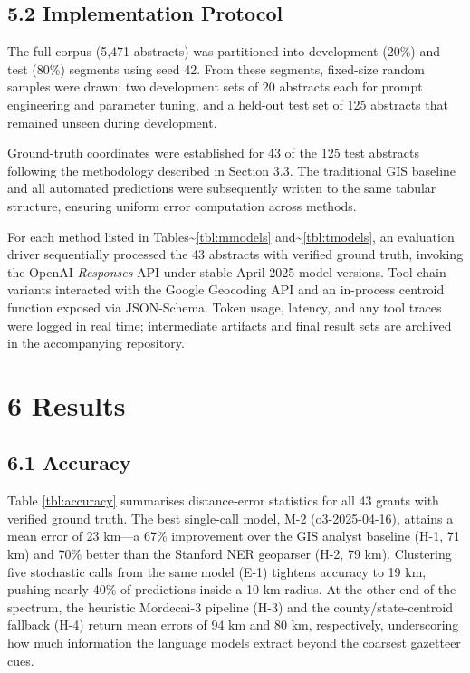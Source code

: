\documentclass[
  10pt,
  twocolumn]{article}
\begin{document}
\subsection{5.2 Implementation Protocol}\label{implementation-protocol}

The full corpus (5,471 abstracts) was partitioned into development
(20\%) and test (80\%) segments using seed 42. From these segments,
fixed-size random samples were drawn: two development sets of 20
abstracts each for prompt engineering and parameter tuning, and a
held-out test set of 125 abstracts that remained unseen during
development.

Ground-truth coordinates were established for 43 of the 125 test
abstracts following the methodology described in Section 3.3. The
traditional GIS baseline and all automated predictions were subsequently
written to the same tabular structure, ensuring uniform error
computation across methods.

For each method listed in Tables\textasciitilde{}\ref{tbl:mmodels}
and\textasciitilde{}\ref{tbl:tmodels}, an evaluation driver sequentially
processed the 43 abstracts with verified ground truth, invoking the
OpenAI \emph{Responses} API under stable April-2025 model versions.
Tool-chain variants interacted with the Google Geocoding API and an
in-process centroid function exposed via JSON-Schema. Token usage,
latency, and any tool traces were logged in real time; intermediate
artifacts and final result sets are archived in the accompanying
repository.

\section{6 Results}\label{results}

\subsection{6.1 Accuracy}\label{accuracy}

Table \ref{tbl:accuracy} summarises distance‐error statistics for all 43
grants with verified ground truth. The best single-call model, M-2
(o3-2025-04-16), attains a mean error of 23 km---a 67\% improvement over
the GIS analyst baseline (H-1, 71 km) and 70\% better than the Stanford
NER geoparser (H-2, 79 km). Clustering five stochastic calls from the
same model (E-1) tightens accuracy to 19 km, pushing nearly 40\% of
predictions inside a 10 km radius. At the other end of the spectrum, the
heuristic Mordecai-3 pipeline (H-3) and the county/state-centroid
fallback (H-4) return mean errors of 94 km and 80 km, respectively,
underscoring how much information the language models extract beyond the
coarsest gazetteer cues.
\end{document}
